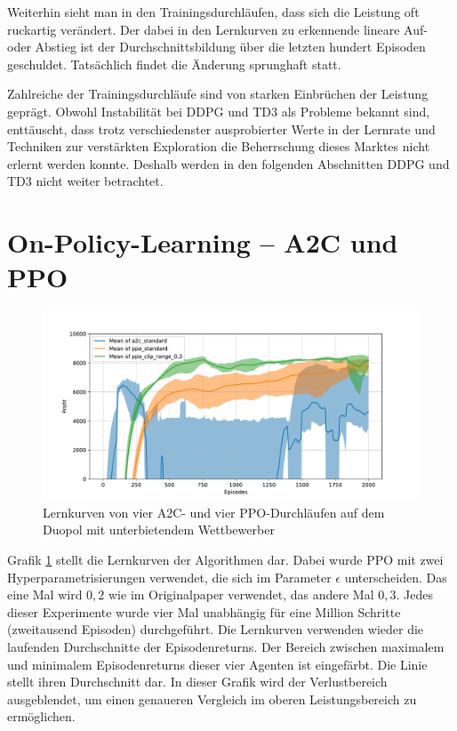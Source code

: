Weiterhin sieht man in den Trainingsdurchläufen, dass sich die Leistung oft ruckartig verändert.
Der dabei in den Lernkurven zu erkennende lineare Auf- oder Abstieg ist der Durchschnittsbildung über die letzten hundert Episoden geschuldet.
Tatsächlich findet die Änderung sprunghaft statt.

Zahlreiche der Trainingsdurchläufe sind von starken Einbrüchen der Leistung geprägt.
Obwohl Instabilität bei DDPG und TD3 als Probleme bekannt sind, enttäuscht, dass trotz verschiedenster ausprobierter Werte in der Lernrate und Techniken zur verstärkten Exploration die Beherrschung dieses Marktes nicht erlernt werden konnte.
Deshalb werden in den folgenden Abschnitten DDPG und TD3 nicht weiter betrachtet.

\section{On-Policy-Learning -- A2C und PPO}
\label{section:main_ppo}
\begin{figure}[htb]
	\centering
	\includegraphics[width=\textwidth]{main/a2c_vs_ppo.pdf}
	\caption{Lernkurven von vier A2C- und vier PPO-Durchläufen auf dem Duopol mit unterbietendem Wettbewerber}
	\label{graphic:OnPolicyLearningCurves}
\end{figure}

Grafik \ref{graphic:OnPolicyLearningCurves} stellt die Lernkurven der Algorithmen dar.
Dabei wurde PPO mit zwei Hyperparametrisierungen verwendet, die sich im Parameter $\epsilon$ unterscheiden.
Das eine Mal wird $0{,}2$ wie im Originalpaper verwendet, das andere Mal $0{,}3$.
Jedes dieser Experimente wurde vier Mal unabhängig für eine Million Schritte (zweitausend Episoden) durchgeführt.
Die Lernkurven verwenden wieder die laufenden Durchschnitte der Episodenreturns.
Der Bereich zwischen maximalem und minimalem Episodenreturns dieser vier Agenten ist eingefärbt.
Die Linie stellt ihren Durchschnitt dar.
In dieser Grafik wird der Verlustbereich ausgeblendet, um einen genaueren Vergleich im oberen Leistungsbereich zu ermöglichen.

